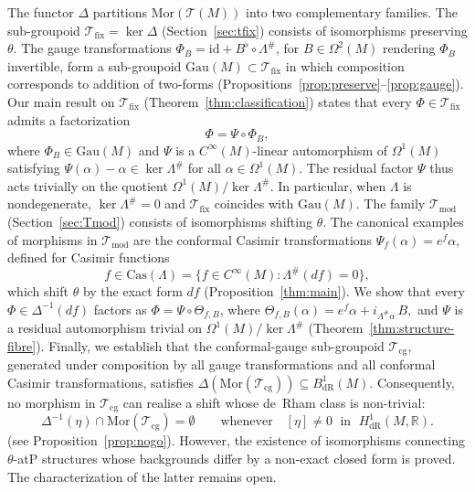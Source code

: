 \documentclass[11pt,a4paper]{article}
\theoremstyle{plain}
\theoremstyle{definition}
\theoremstyle{remark}
\begin{document}
The functor $\Delta$ partitions $\mathrm{Mor}\!\left(\mathcal{T}(M)\right)$ into two complementary
families. The sub-groupoid
$\mathcal{T}_{\mathrm{fix}}=\ker\Delta$ (Section~\ref{sec:tfix}) consists of
isomorphisms preserving $\theta$.
The gauge transformations $\Phi_{B}=\mathrm{id}+B^{\flat}\circ\Lambda^{\#}$, for
$B\in\Omega^{2}(M)$ rendering $\Phi_{B}$ invertible, form a sub-groupoid
$\mathrm{Gau}(M)\subset \mathcal{T}_{\mathrm{fix}}$ in which composition corresponds
to addition of two-forms (Propositions~\ref{prop:preserve}--\ref{prop:gauge}).
Our main result on $\mathcal{T}_{\mathrm{fix}}$ (Theorem~\ref{thm:classification}) states that every
$\Phi\in\mathcal{T}_{\mathrm{fix}}$ admits a factorization
\begin{equation*}
	\Phi=\Psi\circ\Phi_{B},
\end{equation*}
where $\Phi_{B}\in\mathrm{Gau}(M)$ and $\Psi$ is a $C^{\infty}(M)$-linear
automorphism of $\Omega^{1}(M)$ satisfying
$\Psi(\alpha)-\alpha\in\ker\Lambda^{\#}$ for all $\alpha\in\Omega^{1}(M)$.
The residual factor $\Psi$ thus acts trivially on the quotient
$\Omega^{1}(M)/\ker\Lambda^{\#}$. In particular, when $\Lambda$ is nondegenerate,
$\ker\Lambda^{\#}=0$ and $\mathcal{T}_{\mathrm{fix}}$ coincides with $\mathrm{Gau}(M)$.
The family $\mathcal{T}_{\mathrm{mod}}$ (Section~\ref{sec:Tmod}) consists of isomorphisms
shifting $\theta$.
The canonical examples of morphisms in $\mathcal{T}_{\mathrm{mod}}$   are the conformal Casimir transformations
$\Psi_{f}(\alpha)=e^{f}\alpha$, defined for Casimir functions
$$
f\in\mathrm{Cas}(\Lambda)
=\{f\in C^{\infty}(M):\Lambda^{\#}(df)=0\},
$$
which shift $\theta$ by the exact form $df$ (Proposition~\ref{thm:main}).
We show that every $\Phi\in\Delta^{-1}(df)$ factors as
$\Phi=\Psi\circ\Theta_{f,B}$, where
$
\Theta_{f,B}(\alpha)=e^{f}\alpha+i_{\Lambda^{\#}\!\alpha}\,B,
$
and $\Psi$ is a residual automorphism trivial on $\Omega^{1}(M)/\ker\Lambda^{\#}$
(Theorem~\ref{thm:structure-fibre}).
Finally, we establish that the conformal-gauge sub-groupoid $\mathcal{T}_{\mathrm{cg}}$,
generated under composition by all gauge transformations and all conformal Casimir transformations,
satisfies
$\Delta\!\left(\mathrm{Mor}(\mathcal{T}_{\mathrm{cg}})\right)\subseteq B^{1}_{\mathrm{dR}}(M)$.
Consequently, no morphism in $\mathcal{T}_{\mathrm{cg}}$ can realise a shift whose de~Rham
class is non-trivial:
$$
\Delta^{-1}(\eta)\cap\mathrm{Mor}(\mathcal{T}_{\mathrm{cg}})=\emptyset
\qquad\text{whenever}\quad
[\eta]\neq 0\;\text{ in }\;H^{1}_{\mathrm{dR}}(M,\mathbb{R}).
$$
(see Proposition~\ref{prop:nogo}).
However, the existence of isomorphisms connecting $\theta$-atP structures whose backgrounds differ
by a non-exact closed form is proved.
The characterization of the latter remains open.
\end{document}
